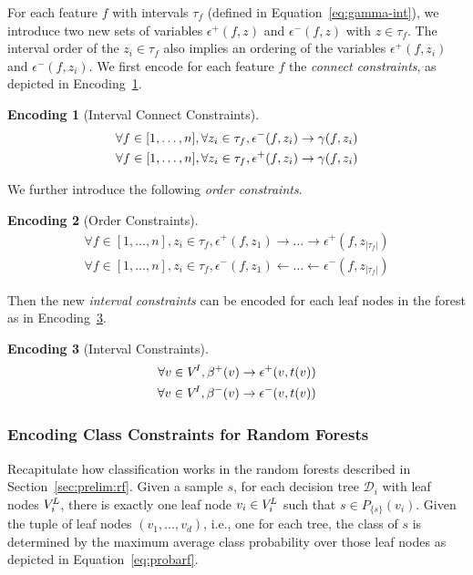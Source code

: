 \documentclass{easychair}
\theoremstyle{definition}
\newtheorem{encoding}{Encoding}[section]
\begin{document}
\newcommand{\interhv}[2]{\epsilon^+(#1,#2)}%
\newcommand{\interlv}[2]{\epsilon^-(#1,#2)}%
For each feature $f$ with intervals $\tau_f$ (defined in Equation~\ref{eq:gamma-int}), we introduce two new sets of variables $\interhv{f}{z}$ and $\interlv{f}{z}$ with $z \in \tau_f$. 
The interval order of the $z_i \in \tau_f$ also implies an ordering of the variables $\interhv{f}{z_i}$ and $\interlv{f}{z_i}$. 
We first encode for each feature $f$ the \emph{connect constraints}, as depicted in Encoding~\ref{enc:connect}. 
%
\begin{encoding}[Interval Connect Constraints]
\label{enc:connect}
\begin{align*}
\forall f \in [1, \dots, n], \forall z_i \in \tau_f, \interlv{f}{z_i} &\rightarrow \interv{f}{z_i}\\
\forall f \in [1, \dots, n], \forall z_i \in \tau_f, \interhv{f}{z_i} &\rightarrow \interv{f}{z_i}
\end{align*}
\end{encoding}
%
We further introduce the following \emph{order constraints}. 
%
\begin{encoding}[Order Constraints]
\begin{align*}
\forall f \in [1, \dots, n], z_i \in \tau_f, \interhv{f}{z_1} \rightarrow \dots \rightarrow \interhv{f}{z_{|\tau_f|}}\\
\forall f \in [1, \dots, n], z_i \in \tau_f, \interlv{f}{z_1} \leftarrow \dots \leftarrow \interlv{f}{z_{|\tau_f|}}
\end{align*}
\end{encoding}%
%
Then the new \emph{interval constraints} can be encoded for each leaf nodes in the forest as in Encoding~\ref{enc:inter-rf}. %
%
\begin{encoding}[Interval Constraints]
\label{enc:inter-rf}
\begin{align*}
\forall v \in \innernodes, \nodehv{v} \rightarrow \interhv{v}{t(v)}\\
\forall v \in \innernodes, \nodelv{v} \rightarrow \interlv{v}{t(v)}
\end{align*}
\end{encoding}


\subsubsection{Encoding Class Constraints for Random Forests}
\label{sec:class-rf}

Recapitulate how classification works in the random forests described in Section~\ref{sec:prelim:rf}. 
Given a sample $s$, for each decision tree $\mathcal{D}_i$ with leaf nodes $V^{\!L}_i$, there is exactly one leaf node $v_i \in V^{\!L}_i$ such that $s \in P_{\!\{\!s\!\}}(v_i)$. 
Given the tuple of leaf nodes $(v_1, \dots, v_d)$, i.e., one for each tree, the class of $s$ is determined by the maximum average class probability over those leaf nodes as depicted in Equation~\ref{eq:probarf}. 
\end{document}
